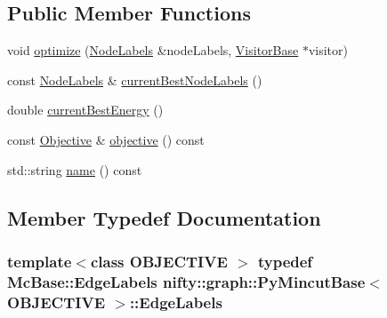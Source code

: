 \subsection*{Public Member Functions}
\begin{DoxyCompactItemize}
\item 
void \hyperlink{classnifty_1_1graph_1_1PyMincutBase_ad299a817858e3e3880c82911661315ad}{optimize} (\hyperlink{classnifty_1_1graph_1_1MincutBase_a9dc6555e37d38de23f194f87ca1497d5}{Node\+Labels} \&node\+Labels, \hyperlink{classnifty_1_1graph_1_1MincutBase_a5ba378dc5a1fc073eb9449ca635e7648}{Visitor\+Base} $\ast$visitor)
\item 
const \hyperlink{classnifty_1_1graph_1_1MincutBase_a9dc6555e37d38de23f194f87ca1497d5}{Node\+Labels} \& \hyperlink{classnifty_1_1graph_1_1PyMincutBase_a47f76c9c0c180328b8f04ce12f917f5b}{current\+Best\+Node\+Labels} ()
\item 
double \hyperlink{classnifty_1_1graph_1_1PyMincutBase_af98d5f7b8b44494f9059825a67117ca7}{current\+Best\+Energy} ()
\item 
const \hyperlink{classnifty_1_1graph_1_1MincutBase_afac19d146202da5a1d3a4aa4b89ea1fc}{Objective} \& \hyperlink{classnifty_1_1graph_1_1PyMincutBase_a93b0cce08cd2139ae68f71d027c6a5ef}{objective} () const 
\item 
std\+::string \hyperlink{classnifty_1_1graph_1_1PyMincutBase_ab090626d8b15029b79650e459a273be1}{name} () const 
\end{DoxyCompactItemize}


\subsection{Member Typedef Documentation}
\hypertarget{classnifty_1_1graph_1_1PyMincutBase_a7c378974e38484a03cebc88abe5ec7a8}{}
\subsubsection[{Edge\+Labels}]{\setlength{\rightskip}{0pt plus 5cm}template$<$class O\+B\+J\+E\+C\+T\+I\+V\+E $>$ typedef {\bf Mc\+Base\+::\+Edge\+Labels} {\bf nifty\+::graph\+::\+Py\+Mincut\+Base}$<$ O\+B\+J\+E\+C\+T\+I\+V\+E $>$\+::{\bf Edge\+Labels}}\label{classnifty_1_1graph_1_1PyMincutBase_a7c378974e38484a03cebc88abe5ec7a8}
\hypertarget{classnifty_1_1graph_1_1PyMincutBase_a2e4ede4ebb88bade74760108d2f79652}{}
